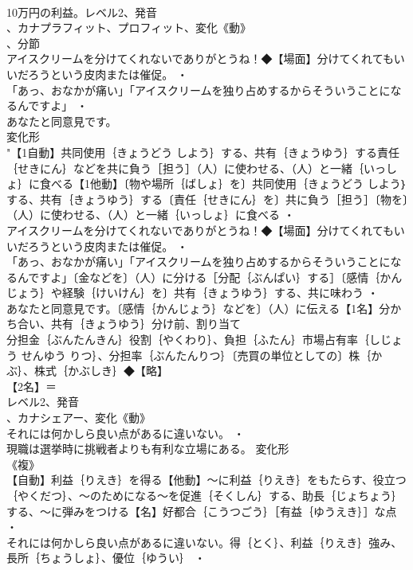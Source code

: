 \documentclass[8pt]{extreport}
\begin{document}
\begin{CJK}{UTF8}{min}
\\	10万円の利益。レベル2、発音
\\	、カナプラフィット、プロフィット、変化《動》
\\	、分節
\\	アイスクリームを分けてくれないでありがとうね！◆【場面】分けてくれてもいいだろうという皮肉または催促。 ・
\\	「あっ、おなかが痛い」「アイスクリームを独り占めするからそういうことになるんですよ」 ・
\\	あなたと同意見です。
\\	変化形 
\\	"【1自動】共同使用｛きょうどう しよう｝する、共有｛きょうゆう｝する責任｛せきにん｝などを共に負う［担う］（人）に使わせる、（人）と一緒｛いっしょ｝に食べる【1他動】〔物や場所｛ばしょ｝を〕共同使用｛きょうどう しよう｝する、共有｛きょうゆう｝する〔責任｛せきにん｝を〕共に負う［担う］〔物を〕（人）に使わせる、（人）と一緒｛いっしょ｝に食べる ・
\\	アイスクリームを分けてくれないでありがとうね！◆【場面】分けてくれてもいいだろうという皮肉または催促。 ・
\\	「あっ、おなかが痛い」「アイスクリームを独り占めするからそういうことになるんですよ」〔金などを〕（人）に分ける［分配｛ぶんぱい｝する］〔感情｛かんじょう｝や経験｛けいけん｝を〕共有｛きょうゆう｝する、共に味わう ・
\\	あなたと同意見です。〔感情｛かんじょう｝などを〕（人）に伝える【1名】分かち合い、共有｛きょうゆう｝分け前、割り当て
\\	分担金｛ぶんたんきん｝役割｛やくわり｝、負担｛ふたん｝市場占有率｛しじょう せんゆう りつ｝、分担率｛ぶんたんりつ｝〔売買の単位としての〕株｛かぶ｝、株式｛かぶしき｝◆【略】
\\	【2名】＝ 
\\	レベル2、発音
\\	、カナシェアー、変化《動》
\\	それには何かしら良い点があるに違いない。 ・
\\	現職は選挙時に挑戦者よりも有利な立場にある。	変化形 
\\	《複》
\\	【自動】利益｛りえき｝を得る【他動】～に利益｛りえき｝をもたらす、役立つ｛やくだつ｝、～のためになる～を促進｛そくしん｝する、助長｛じょちょう｝する、～に弾みをつける【名】好都合｛こうつごう｝［有益｛ゆうえき｝］な点 ・
\\	それには何かしら良い点があるに違いない。得｛とく｝、利益｛りえき｝強み、長所｛ちょうしょ｝、優位｛ゆうい｝ ・

\end{CJK}
\end{document}
